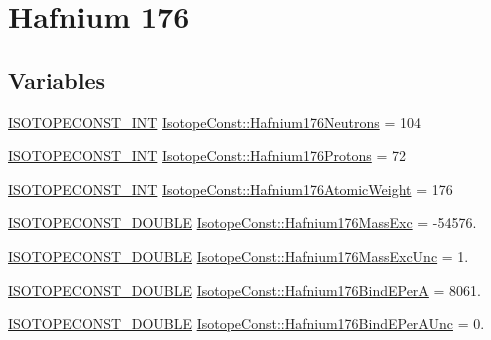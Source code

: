 \hypertarget{group___isotope_const-_hafnium-_hf176}{}\section{Hafnium 176}
\label{group___isotope_const-_hafnium-_hf176}
\subsection*{Variables}
\begin{DoxyCompactItemize}
\item 
\mbox{\hyperlink{group___isotope_const-_macros_ga5f18360b3e99483a35c32d789e62621c}{I\+S\+O\+T\+O\+P\+E\+C\+O\+N\+S\+T\+\_\+\+I\+NT}} \mbox{\hyperlink{group___isotope_const-_hafnium-_hf176_gae6c32e815a0a15f8685e1784ddf0b851}{Isotope\+Const\+::\+Hafnium176\+Neutrons}} = 104
\item 
\mbox{\hyperlink{group___isotope_const-_macros_ga5f18360b3e99483a35c32d789e62621c}{I\+S\+O\+T\+O\+P\+E\+C\+O\+N\+S\+T\+\_\+\+I\+NT}} \mbox{\hyperlink{group___isotope_const-_hafnium-_hf176_gac1e0b62f6693c858732651f0dfcf4865}{Isotope\+Const\+::\+Hafnium176\+Protons}} = 72
\item 
\mbox{\hyperlink{group___isotope_const-_macros_ga5f18360b3e99483a35c32d789e62621c}{I\+S\+O\+T\+O\+P\+E\+C\+O\+N\+S\+T\+\_\+\+I\+NT}} \mbox{\hyperlink{group___isotope_const-_hafnium-_hf176_ga4a82d1e3f0e3a22cb69c875b7fc5e0f4}{Isotope\+Const\+::\+Hafnium176\+Atomic\+Weight}} = 176
\item 
\mbox{\hyperlink{group___isotope_const-_macros_ga8f45a7272ce02c0b4c65c44636ed719a}{I\+S\+O\+T\+O\+P\+E\+C\+O\+N\+S\+T\+\_\+\+D\+O\+U\+B\+LE}} \mbox{\hyperlink{group___isotope_const-_hafnium-_hf176_gaaf207c59d8cddd64953c6b547f0f543d}{Isotope\+Const\+::\+Hafnium176\+Mass\+Exc}} = -\/54576.
\item 
\mbox{\hyperlink{group___isotope_const-_macros_ga8f45a7272ce02c0b4c65c44636ed719a}{I\+S\+O\+T\+O\+P\+E\+C\+O\+N\+S\+T\+\_\+\+D\+O\+U\+B\+LE}} \mbox{\hyperlink{group___isotope_const-_hafnium-_hf176_gaf2ba5d8186c14fb75c4fb059c492c39a}{Isotope\+Const\+::\+Hafnium176\+Mass\+Exc\+Unc}} = 1.
\item 
\mbox{\hyperlink{group___isotope_const-_macros_ga8f45a7272ce02c0b4c65c44636ed719a}{I\+S\+O\+T\+O\+P\+E\+C\+O\+N\+S\+T\+\_\+\+D\+O\+U\+B\+LE}} \mbox{\hyperlink{group___isotope_const-_hafnium-_hf176_ga1ebbc67d0cc4296c5beed321cdb9ba76}{Isotope\+Const\+::\+Hafnium176\+Bind\+E\+PerA}} = 8061.
\item 
\mbox{\hyperlink{group___isotope_const-_macros_ga8f45a7272ce02c0b4c65c44636ed719a}{I\+S\+O\+T\+O\+P\+E\+C\+O\+N\+S\+T\+\_\+\+D\+O\+U\+B\+LE}} \mbox{\hyperlink{group___isotope_const-_hafnium-_hf176_gaf09f3f24357e54fae9e83d9d1b4ab932}{Isotope\+Const\+::\+Hafnium176\+Bind\+E\+Per\+A\+Unc}} = 0.

\end{DoxyCompactItemize}
